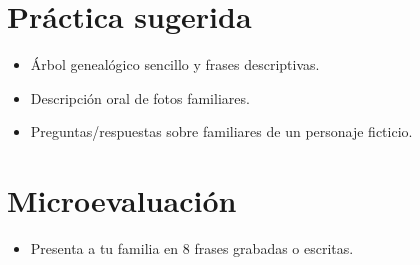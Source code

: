 \section{Práctica sugerida}
\begin{itemize}[leftmargin=*]
	\item Árbol genealógico sencillo y frases descriptivas.
	\item Descripción oral de fotos familiares.
	\item Preguntas/respuestas sobre familiares de un personaje ficticio.
\end{itemize}

\section{Microevaluación}
\begin{itemize}[leftmargin=*]
	\item Presenta a tu familia en 8 frases grabadas o escritas.
\end{itemize}
